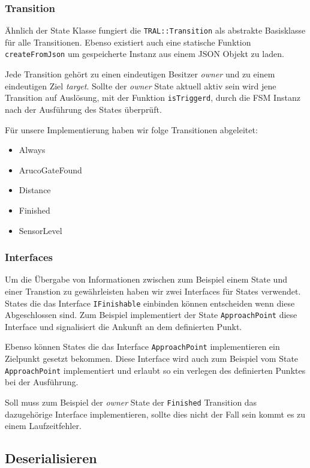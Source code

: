 \subsubsection{Transition}
Ähnlich der State Klasse fungiert die \texttt{TRAL::Transition} als abstrakte Basisklasse für alle Transitionen. Ebenso existiert auch eine statische Funktion \texttt{createFromJson} um gespeicherte Instanz aus einem JSON Objekt zu laden. 

Jede Transition gehört zu einen eindeutigen Besitzer \textit{owner} und zu einem eindeutigen Ziel \textit{target}. Sollte der \textit{owner} State aktuell aktiv sein wird jene Transition auf Auslösung, mit der Funktion \texttt{isTriggerd}, durch die FSM Instanz nach der Ausführung des States überprüft.

Für unsere Implementierung haben wir folge Transitionen abgeleitet:

\begin{itemize}
	\item Always
	\item ArucoGateFound
	\item Distance
	\item Finished
	\item SensorLevel
\end{itemize}

\subsubsection{Interfaces}

Um die Übergabe von Informationen zwischen zum Beispiel einem State und einer Transtion zu gewährleisten haben wir zwei Interfaces für States verwendet. 
States die das Interface \texttt{IFinishable} einbinden können entscheiden wenn diese Abgeschlossen sind. Zum Beispiel implementiert der State \texttt{ApproachPoint} diese Interface und signalisiert die Ankunft an dem definierten Punkt.

Ebenso können States die das Interface \texttt{ApproachPoint} implementieren ein Zielpunkt gesetzt bekommen. Diese Interface wird auch zum Beispiel vom State \texttt{ApproachPoint} implementiert und erlaubt so ein verlegen des definierten Punktes bei der Ausführung.

Soll muss zum Beispiel der \textit{owner} State der \texttt{Finished} Transition das dazugehörige Interface implementieren, sollte dies nicht der Fall sein kommt es zu einem Laufzeitfehler.

\subsection{Deserialisieren}
\label{fsm-Deserialisieren}

